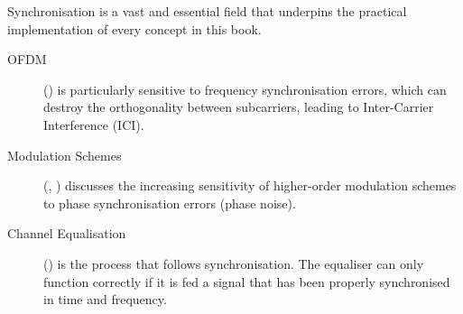 \begin{importantbox}[title={Further Reading}]
    Synchronisation is a vast and essential field that underpins the practical implementation of every concept in this book.
    \begin{description}
        \item[OFDM] () is particularly sensitive to frequency synchronisation errors, which can destroy the orthogonality between subcarriers, leading to Inter-Carrier Interference (ICI).
        \item[Modulation Schemes] (, ) discusses the increasing sensitivity of higher-order modulation schemes to phase synchronisation errors (phase noise).
        \item[Channel Equalisation] () is the process that follows synchronisation. The equaliser can only function correctly if it is fed a signal that has been properly synchronised in time and frequency.
    \end{description}
\end{importantbox}
